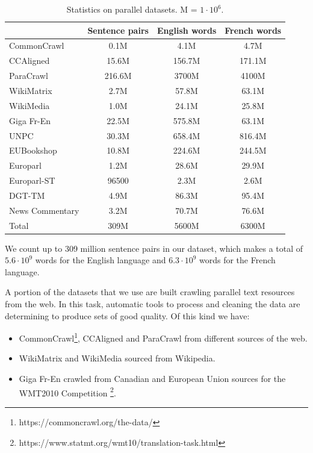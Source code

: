 \documentclass[11pt,english,listoffigures,listoftables]{tfgetsinf}
\begin{document}
\begin{table}
\caption{Statistics on parallel datasets. M = $1\cdot10^6.$}
\centering
\begin{tabular}{l|c|c|c}
 & Sentence pairs & English words & French words\\
\hline
    CommonCrawl & 0.1M & 4.1M & 4.7M \\
    CCAligned & 15.6M & 156.7M & 171.1M \\
    ParaCrawl & 216.6M & 3700M & 4100M \\
    WikiMatrix & 2.7M & 57.8M & 63.1M \\
    WikiMedia & 1.0M & 24.1M & 25.8M \\
    Giga Fr-En & 22.5M & 575.8M & 63.1M \\
    UNPC & 30.3M & 658.4M & 816.4M \\
    EUBookshop & 10.8M & 224.6M & 244.5M \\
    Europarl & 1.2M & 28.6M & 29.9M \\
    Europarl-ST & 96500 & 2.3M & 2.6M \\
    DGT-TM & 4.9M & 86.3M & 95.4M \\
    News Commentary & 3.2M & 70.7M & 76.6M \\
\hline
    Total & 309M & 5600M & 6300M \\
\end{tabular}
\label{chap2:trainset}
\end{table}



We count up to 309 million sentence pairs in our dataset, which makes a total of $5.6 \cdot 10^9$ words for the English language and $6.3 \cdot 10^9$ words for the French language.

A portion of the datasets that we use are built crawling parallel text resources from the web. In this task, automatic tools to process and cleaning the data are determining to produce sets of good quality. Of this kind we have:
\begin{itemize}
    \item CommonCrawl\footnote{https://commoncrawl.org/the-data/}, CCAligned \cite{el-kishky-etal-2020-ccaligned} and ParaCrawl \cite{banon-etal-2020-paracrawl} from different sources of the web.
    \item WikiMatrix \cite{DBLP:journals/corr/abs-1907-05791} and WikiMedia \cite{tiedemann-2012-parallel} sourced from Wikipedia.
    \item Giga Fr-En \cite{TIEDEMANN12.463} crawled from Canadian and European Union sources for the WMT2010 Competition \footnote{https://www.statmt.org/wmt10/translation-task.html}.
\end{itemize}
\end{document}
